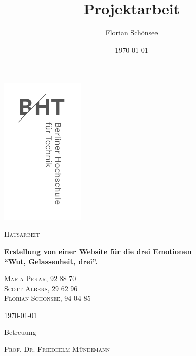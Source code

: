 \documentclass[11pt,a4paper,twoside]{report} %
\title{Projektarbeit}
\author{Florian Schönsee}
\date{\today}
\begin{document}
\color{mytextgrey}
\begin{titlepage}
     \hfill
     \includegraphics[width=0.3\textwidth]{bilder/BHT_Logo_vertikal_Anthrazit_transparent_RGB_288ppi.png}
     \par\vspace{1cm}
     \raggedright
     \vspace{.5cm}
         {\scshape\Large Hausarbeit \par}
         \vspace{1cm}
     {\LARGE \bfseries Erstellung von einer Website für die drei Emotionen\\“Wut, Gelassenheit, drei”. \par}   
     \vspace{2cm}
     {\Large \textsc{Maria Pekar, 92 88 70 \\Scott Albers, 29 62 96\\Florian Schönsee, 94 04 85}\par}
     \vspace{0.5cm}
     \today
     \vfill
         {\small Betreuung \par}
         \textsc{Prof. Dr. Friedhelm Mündemann}
 \end{titlepage}
 

\onehalfspacing
{}
\tableofcontents
% 

\pagebreak
{}




\pagebreak


\pagebreak

\pagebreak

\pagebreak

\pagebreak

\pagebreak

\pagebreak

\setcounter{page}{2}
\pagebreak
{}
\pagebreak
{}
\renewcommand\listoflistingscaption{Quellcodeverzeichnis}
\listoflistings %
\pagebreak
{}
\printbibliography
\pagebreak
\end{document}
